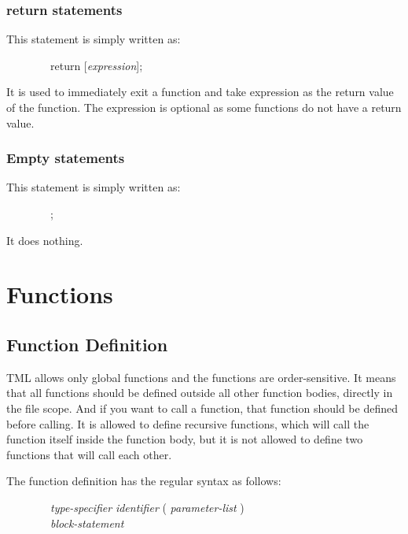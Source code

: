 \documentclass[12pt,psfig,a4]{article}
\begin{document}
\subsubsection{return statements}
This statement is simply written as:

\begin{code}
\begin{tabbing}
~~~~~~~~return [\textsl{expression}];
\end{tabbing}
\end{code}

It is used to immediately exit a function and take expression as the return value of the function. The expression is optional as some functions do not have a return value.

\subsubsection{Empty statements}
This statement is simply written as:

\begin{code}
\begin{tabbing}
~~~~~~~~;
\end{tabbing}
\end{code}

It does nothing.


\section{Functions}

\subsection{Function Definition}
TML allows only global functions and the functions are order-sensitive. It means that all functions should be defined outside all other function bodies, directly in the file scope. And if you want to call a function, that function should be defined before calling. It is allowed to define recursive functions, which will call the function itself inside the function body, but it is not allowed to define two functions that will call each other.

The function definition has the regular syntax as follows:
\begin{code}
\begin{tabbing}
~~~~~~~~\= \textsl{type-specifier} \textsl{identifier} ( \textsl{parameter-list} ) \\
\> ~~~~~~~~\textsl{block-statement}
\end{tabbing}
\end{code}
\end{document}
